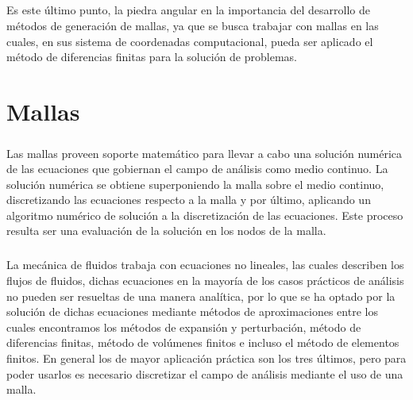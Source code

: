 \documentclass[letterpaper, openright, 12pt]{book}
\begin{document}
    \paragraph*{}
    Es este último punto, la piedra angular en la importancia del desarrollo de
    métodos de generación de mallas, ya que se busca trabajar con mallas en las
    cuales, en sus sistema de coordenadas computacional, pueda ser aplicado el
    método de diferencias finitas para la solución de problemas.

    \chapter{Mallas}
    \label{chap:mallas}
    \paragraph*{}
    Las mallas proveen soporte matemático para llevar a cabo una solución
    numérica de las ecuaciones que gobiernan el campo de análisis como medio
    continuo. La solución numérica se obtiene superponiendo la malla sobre el
    medio continuo, discretizando las ecuaciones respecto a la malla y por
    último, aplicando un algoritmo numérico de solución a la discretización de
    las ecuaciones. Este proceso resulta ser una evaluación de la solución en
    los nodos de la malla.
    \paragraph*{}
    La mecánica de fluidos trabaja con ecuaciones no lineales, las cuales
    describen los flujos de fluidos, dichas ecuaciones en la mayoría de los
    casos prácticos de análisis no pueden ser resueltas de una manera analítica,
    por lo que se ha optado por la solución de dichas ecuaciones mediante
    métodos de aproximaciones entre los cuales encontramos los métodos de
    expansión y perturbación, método de diferencias finitas, método de volúmenes
    finitos e incluso el método de elementos finitos. En general los de mayor
    aplicación práctica son los tres últimos, pero para poder usarlos es
    necesario discretizar el campo de análisis mediante el uso de una malla.\cite{thompsonhandbook}
\end{document}
